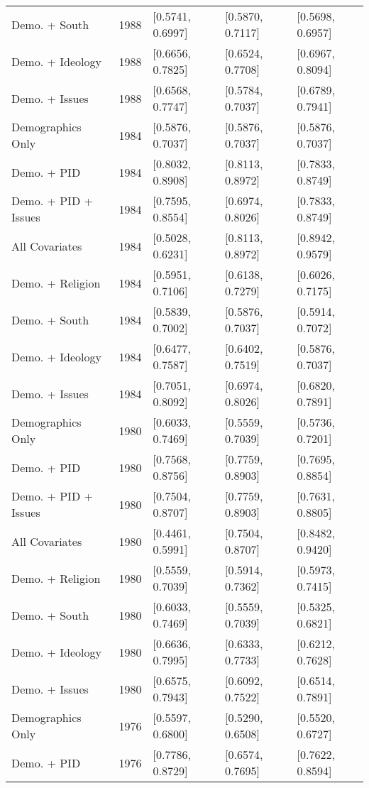 \begin{longtable}{lrlll}
  Demo. + South & 1988 & [0.5741, 0.6997] & [0.5870, 0.7117] & [0.5698, 0.6957] \\ 
  Demo. + Ideology & 1988 & [0.6656, 0.7825] & [0.6524, 0.7708] & [0.6967, 0.8094] \\ 
  Demo. + Issues & 1988 & [0.6568, 0.7747] & [0.5784, 0.7037] & [0.6789, 0.7941] \\ 
  Demographics Only & 1984 & [0.5876, 0.7037] & [0.5876, 0.7037] & [0.5876, 0.7037] \\ 
  Demo. + PID & 1984 & [0.8032, 0.8908] & [0.8113, 0.8972] & [0.7833, 0.8749] \\ 
  Demo. + PID + Issues & 1984 & [0.7595, 0.8554] & [0.6974, 0.8026] & [0.7833, 0.8749] \\ 
  All Covariates & 1984 & [0.5028, 0.6231] & [0.8113, 0.8972] & [0.8942, 0.9579] \\ 
  Demo. + Religion & 1984 & [0.5951, 0.7106] & [0.6138, 0.7279] & [0.6026, 0.7175] \\ 
  Demo. + South & 1984 & [0.5839, 0.7002] & [0.5876, 0.7037] & [0.5914, 0.7072] \\ 
  Demo. + Ideology & 1984 & [0.6477, 0.7587] & [0.6402, 0.7519] & [0.5876, 0.7037] \\ 
  Demo. + Issues & 1984 & [0.7051, 0.8092] & [0.6974, 0.8026] & [0.6820, 0.7891] \\ 
  Demographics Only & 1980 & [0.6033, 0.7469] & [0.5559, 0.7039] & [0.5736, 0.7201] \\ 
  Demo. + PID & 1980 & [0.7568, 0.8756] & [0.7759, 0.8903] & [0.7695, 0.8854] \\ 
  Demo. + PID + Issues & 1980 & [0.7504, 0.8707] & [0.7759, 0.8903] & [0.7631, 0.8805] \\ 
  All Covariates & 1980 & [0.4461, 0.5991] & [0.7504, 0.8707] & [0.8482, 0.9420] \\ 
  Demo. + Religion & 1980 & [0.5559, 0.7039] & [0.5914, 0.7362] & [0.5973, 0.7415] \\ 
  Demo. + South & 1980 & [0.6033, 0.7469] & [0.5559, 0.7039] & [0.5325, 0.6821] \\ 
  Demo. + Ideology & 1980 & [0.6636, 0.7995] & [0.6333, 0.7733] & [0.6212, 0.7628] \\ 
  Demo. + Issues & 1980 & [0.6575, 0.7943] & [0.6092, 0.7522] & [0.6514, 0.7891] \\ 
  Demographics Only & 1976 & [0.5597, 0.6800] & [0.5290, 0.6508] & [0.5520, 0.6727] \\ 
  Demo. + PID & 1976 & [0.7786, 0.8729] & [0.6574, 0.7695] & [0.7622, 0.8594] \\ 

\end{longtable}
